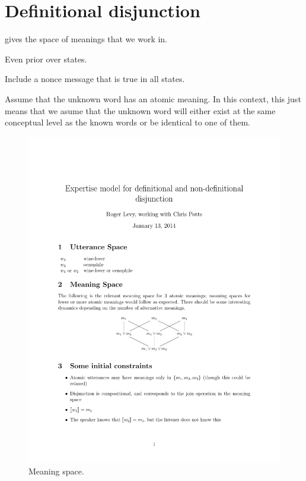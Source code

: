 \section{Definitional disjunction}\label{sec:defdisj}

 gives the space of meanings that we work in.

Even prior over states.

Include a nonce message that is true in all states.

Assume that the unknown word has an atomic meaning. In this context,
this just means that we asume that the unknown word will either exist
at the same conceptual level as the known words or be identical to one
of them.



\begin{figure}[htp]
  \centering
  \includegraphics[scale=1]{images/meaningspace}
  \caption{Meaning space.}
  \label{fig:meaningspace}
\end{figure}


